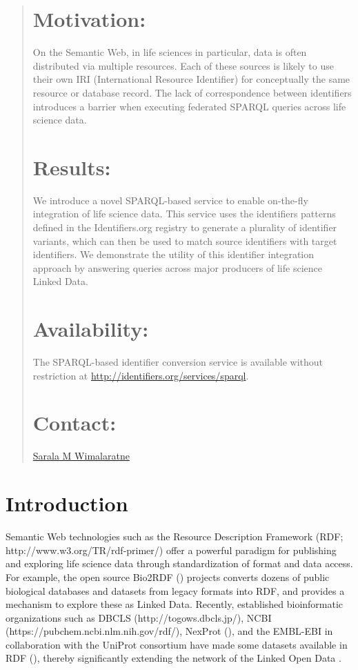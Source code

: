 \documentclass{bioinfo}
\begin{document}
\begin{abstract}
\section{Motivation:}
On the Semantic Web, in life sciences in particular, data is often distributed via multiple resources. Each of these sources is likely to use their own IRI (International Resource Identifier) for conceptually the same resource or database record. The lack of correspondence between identifiers introduces a barrier when executing federated SPARQL queries across life science data.

\section{Results:}
We introduce a novel SPARQL-based service to enable on-the-fly integration of life science data. This service uses the identifiers patterns defined in the Identifiers.org registry to generate a plurality of identifier variants, which can then be used to match source identifiers with target identifiers. We demonstrate the utility of this identifier integration approach by answering queries across major producers of life science Linked Data.

\section{Availability:}
The SPARQL-based identifier conversion service is available without restriction at \linebreak\href{http://identifiers.org/services/sparql}{http://identifiers.org/services/sparql}.

\section{Contact:} \href{sarala@ebi.ac.uk}{Sarala M Wimalaratne}
\end{abstract}

\section{Introduction}
Semantic Web technologies such as the Resource Description Framework (RDF; http://www.w3.org/TR/rdf-primer/) offer a powerful paradigm for publishing and exploring life science data through standardization of format and data access. For example, the open source Bio2RDF (\cite{Biordf2}) projects converts dozens of public biological databases and datasets from legacy formats into RDF, and provides a mechanism to explore these as Linked Data. Recently, established bioinformatic organizations such as DBCLS (http://togows.dbcls.jp/), NCBI (https://pubchem.ncbi.nlm.nih.gov/rdf/), NexProt (\cite{Chichester2014}), and the EMBL-EBI in collaboration with the UniProt consortium have made some datasets available in RDF (\cite{Jupp01052014}), thereby significantly extending the network of the Linked Open Data .
\end{document}
